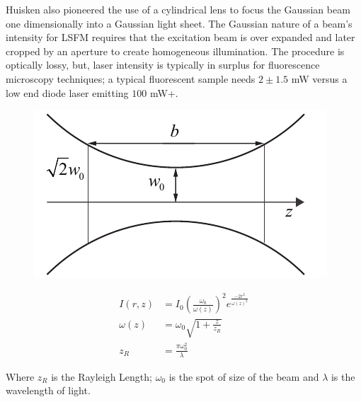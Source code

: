 Huisken also pioneered the use of a cylindrical lens to focus the Gaussian beam one dimensionally into a Gaussian light sheet.
The Gaussian nature of a beam's intensity for LSFM requires that the excitation beam is over expanded and later cropped by an aperture to create homogeneous illumination.
The procedure is optically lossy, but, laser intensity is typically in surplus for fluorescence microscopy techniques; a typical fluorescent sample needs $2\pm 1.5$ mW versus a low end diode laser emitting $100$ mW+.

\begin{figure}
    \centering
    \includegraphics{./GuasianBeam}
    \caption{}
    \label{fig:GuasianBeam}
\end{figure}

\begin{align}
	I(r,z)    & = {I_0} {\left(\frac{\omega_0}{\omega{(z)}}\right)}^2 {e^{\frac{-2r^2}{\omega{(z)}^2}}\label{eq:Guassian}} \\
	\omega(z) & = \omega_0 \sqrt{1+\frac{z}{z_R}} \label{eq:Lorrentzian}                                                   \\
	z_R       & = \frac{\pi\omega_0^2}{\lambda} \label{eq:Rayleigh}
\end{align}

Where $z_R$ is the Rayleigh Length; $\omega_0$ is the spot of size of the beam and $\lambda$ is the wavelength of light.


